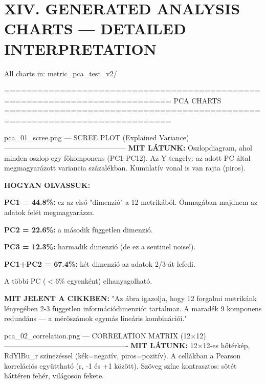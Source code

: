 \documentclass[11pt,a4paper]{article}
\begin{document}
\section*{XIV. GENERATED ANALYSIS CHARTS — DETAILED INTERPRETATION}

All charts in: metric\_pca\_test\_v2/

============================================================================
PCA CHARTS
============================================================================

pca\_01\_scree.png — SCREE PLOT (Explained Variance)
---------------------------------------------------
\textbf{MIT LÁTUNK:}
Oszlopdiagram, ahol minden oszlop egy főkomponens (PC1-PC12).
Az Y tengely: az adott PC által megmagyarázott variancia százalékban.
Kumulatív vonal is van rajta (piros).

\textbf{HOGYAN OLVASSUK:}
\par\noindent\hspace*{1em}\textbullet{} \textbf{PC1 = 44.8\%:} ez az első "dimenzió" a 12 metrikából. Önmagában
majdnem az adatok felét megmagyarázza.
\par\noindent\hspace*{1em}\textbullet{} \textbf{PC2 = 22.6\%:} a második független dimenzió.
\par\noindent\hspace*{1em}\textbullet{} \textbf{PC3 = 12.3\%:} harmadik dimenzió (de ez a sentinel noise!).
\par\noindent\hspace*{1em}\textbullet{} \textbf{PC1+PC2 = 67.4\%:} két dimenzió az adatok 2/3-át lefedi.
\par\noindent\hspace*{1em}\textbullet{} A többi PC ($<$6\% egyenként) elhanyagolható.

\textbf{MIT JELENT A CIKKBEN:}
"Az ábra igazolja, hogy 12 forgalmi metrikánk lényegében 2-3
független információdimenziót tartalmaz. A maradék 9 komponens
redundáns — a mérőszámok egymás lineáris kombinációi."

pca\_02\_correlation.png — CORRELATION MATRIX (12×12)
----------------------------------------------------
\textbf{MIT LÁTUNK:}
12×12-es hőtérkép, RdYlBu\_r színezéssel (kék=negatív, piros=pozitív).
A cellákban a Pearson korrelációs együttható (r, -1 és +1 között).
Szöveg színe kontrasztos: sötét háttéren fehér, világoson fekete.
\end{document}
